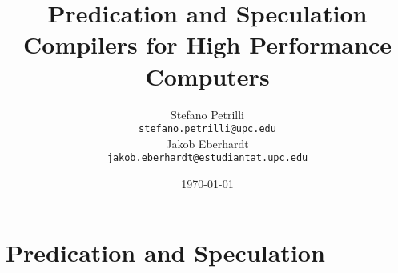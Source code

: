 \documentclass{article}
\begin{document}
\title{Predication and Speculation \\[0.7em] \small{Compilers for High Performance Computers}}
\author{Stefano Petrilli\\ \texttt{stefano.petrilli@upc.edu}\\[1ex] %
  Jakob Eberhardt\\ \texttt{jakob.eberhardt@estudiantat.upc.edu}}
\date{\today}

\maketitle
\thispagestyle{empty}
\newpage
\setcounter{page}{1}
\tableofcontents
\lstlistoflistings
\listoffigures
\listoftables
\newpage







\section{Predication and Speculation}
\label{sec:predication_and_speculation}
\newpage

\printbibliography
\end{document}
